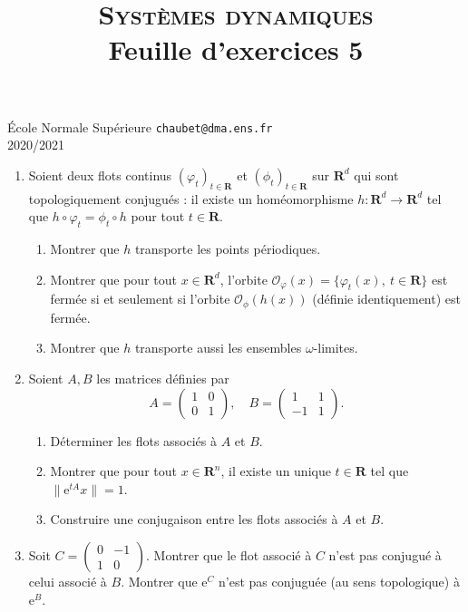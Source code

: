 \documentclass[a4paper,10pt,openany]{article}
\title{\textsc{Syst\`emes dynamiques} \\ Feuille d'exercices 5}
\date{}
\author{}
\theoremstyle{plain}
\theoremstyle{definition}
\newcommand{\e}{\mathrm{e}}
\newcommand{\R}{\mathbf{R}}
\begin{document}
{\noindent \'Ecole Normale Sup\'erieure  \hfill \texttt{chaubet@dma.ens.fr} } \\
{2020/2021 \hfill }

{\let\newpage\relax\maketitle}
\maketitle

  \vspace{1.5mm} 


\begin{enumerate}
\item Soient deux flots continus $(\varphi_t)_{t \in \R}$ et $(\phi_t)_{t\in \R}$ sur $\R^d$ qui sont topologiquement conjugu\'es : il existe un hom\'eomorphisme $h : \R^d \to \R^d$ tel que $h \circ \varphi_t = \phi_t \circ h$ pour tout $t \in \R.$
\begin{enumerate}
\item Montrer que $h$ transporte les points p\'eriodiques.
\item Montrer que pour tout $x \in \R^d$, l'orbite 
$\mathcal{O}_{\varphi}(x) = \{\varphi_t(x),~t\in \R\}$
est ferm\'ee si et seulement si l'orbite $\mathcal{O}_\phi(h(x))$ (d\'efinie identiquement) est ferm\'ee.
\item Montrer que $h$ transporte aussi les ensembles $\omega$-limites.
\end{enumerate}
\item Soient $A,B$ les matrices d\'efinies par
$$
A=\left(\begin{array}{ll}1 & 0 \\ 0 & 1\end{array}\right), \quad B=\left(\begin{array}{cc}1 & 1 \\ -1 & 1\end{array}\right).
$$
\begin{enumerate}
\item D\'eterminer les flots associ\'es \`a $A$ et $B$.
\item Montrer que pour tout $x \in \R^n$, il existe un unique $t \in \R$ tel que $\|\e^{tA}x\| = 1$.
\item Construire une conjugaison entre les flots associ\'es \`a $A$ et $B$.
\end{enumerate}

\item Soit 
$
C = \begin{pmatrix} 0 & -1 \\ 1 & 0 \end{pmatrix}.
$
Montrer que le flot associ\'e \`a $C$ n'est pas conjugu\'e \`a celui associ\'e \`a $B$. Montrer que $\e^{C}$ n'est pas conjugu\'ee (au sens topologique) \`a $\e^{B}$.
\end{enumerate}
\vspace{0.6cm}
\end{document}
